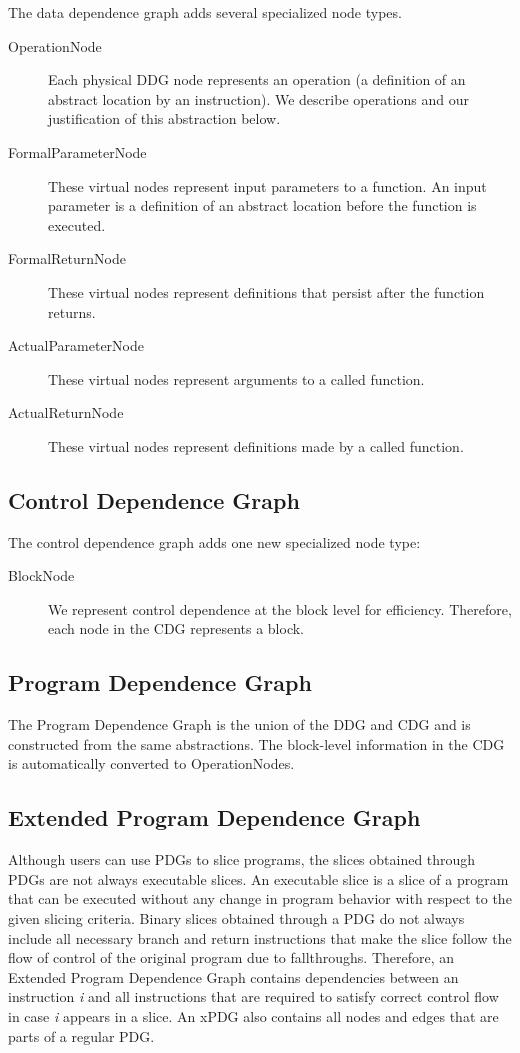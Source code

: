 \documentclass[12pt,titlepage]{article}
\begin{document}
The data dependence graph adds several specialized node types.

\begin{description}
\item[OperationNode] Each physical
DDG node represents an operation (a definition of an abstract location
by an instruction). We describe operations and our justification of
this abstraction below.  
\item[FormalParameterNode] These virtual nodes
represent input parameters to a function. An input parameter is a
definition of an abstract location before the function is executed.
\item[FormalReturnNode] These virtual nodes represent definitions that
persist after the function returns.  
\item[ActualParameterNode] These
virtual nodes represent arguments to a called function.
\item[ActualReturnNode] These virtual nodes represent definitions made by a
called function. 
\end{description}

\subsection{Control Dependence Graph}

The control dependence graph adds one new specialized node type:

\begin{description}
\item[BlockNode] We represent
control dependence at the block level for efficiency. Therefore, each
node in the CDG represents a block. 
\end{description}

\subsection{Program Dependence Graph}
The Program Dependence Graph is the union of the DDG and CDG and is
constructed from the same abstractions. The block-level information in
the CDG is automatically converted to OperationNodes.

\subsection{Extended Program Dependence Graph}
Although users can use PDGs to slice programs, the slices obtained through PDGs
are not always executable slices. An executable slice is a slice of a program that
can be executed without any change in program behavior with respect to the
given slicing criteria. Binary slices obtained through a PDG do not always
include all necessary branch and return instructions that make the slice follow
the flow of control of the original program due to fallthroughs. Therefore, an
Extended Program Dependence Graph contains dependencies between an instruction
\emph{i} and all instructions that are required to satisfy correct control flow
in case \emph{i} appears in a slice. An xPDG also contains all nodes and edges
that are parts of a regular PDG.
\end{document}

